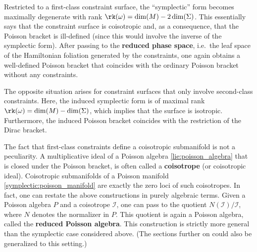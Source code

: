 
    \begin{property}
        Restricted to a first-class constraint surface, the ``symplectic'' form becomes maximally degenerate with rank $\rk(\omega) = \dim(M) - 2\dim(\Sigma)$. This essentially says that the constraint surface is coisotropic and, as a consequence, that the Poisson bracket is ill-defined (since this would involve the inverse of the symplectic form). After passing to the \textbf{reduced phase space}, i.e.~the leaf space of the Hamiltonian foliation generated by the constraints, one again obtains a well-defined Poisson bracket that coincides with the ordinary Poisson bracket without any constraints.

        The opposite situation arises for constraint surfaces that only involve second-class constraints. Here, the induced symplectic form is of maximal rank $\rk(\omega) = \dim(M) - \dim(\Sigma)$, which implies that the surface is isotropic. Furthermore, the induced Poisson bracket coincides with the restriction of the Dirac bracket.
    \end{property}
    \begin{remark}
        The fact that first-class constraints define a coisotropic submanifold is not a peculiarity. A multiplicative ideal of a Poisson algebra \ref{lie:poisson_algebra} that is closed under the Poisson bracket, is often called a \textbf{coisotrope} (or coisotropic ideal). Coisotropic submanifolds of a Poisson manifold  \ref{symplectic:poisson_manifold} are exactly the zero loci of such coisotropes. In fact, one can restate the above constructions in purely algebraic terms. Given a Poisson algebra $P$ and a coisotrope $\mathcal{I}$, one can pass to the quotient $N(\mathcal{I})/\mathcal{I}$, where $N$ denotes the normalizer in $P$. This quotient is again a Poisson algebra, called the \textbf{reduced Poisson algebra}. This construction is strictly more general than the symplectic case considered above. (The sections further on could also be generalized to this setting.)
    \end{remark}

